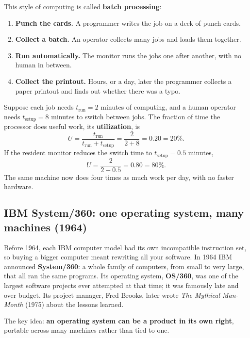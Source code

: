\documentclass[11pt,a4paper]{article}
\newcommand{\term}[1]{\textbf{\color{mintdeep}#1}}
\begin{document}
This style of computing is called \term{batch processing}:

\begin{enumerate}[leftmargin=1.4em]
  \item \textbf{Punch the cards.} A programmer writes the job on a deck of punch cards.
  \item \textbf{Collect a batch.} An operator collects many jobs and loads them together.
  \item \textbf{Run automatically.} The monitor runs the jobs one after another, with no human in between.
  \item \textbf{Collect the printout.} Hours, or a day, later the programmer collects a paper printout and finds out whether there was a typo.
\end{enumerate}

\begin{example}
Suppose each job needs $t_{\text{run}} = 2$ minutes of computing, and a human operator needs $t_{\text{setup}} = 8$ minutes to switch between jobs. The fraction of time the processor does useful work, its \term{utilization}, is
\[
U = \frac{t_{\text{run}}}{t_{\text{run}} + t_{\text{setup}}} = \frac{2}{2+8} = 0.20 = 20\%.
\]
If the resident monitor reduces the switch time to $t_{\text{setup}} = 0.5$ minutes,
\[
U = \frac{2}{2+0.5} = 0.80 = 80\%.
\]
The same machine now does four times as much work per day, with no faster hardware.
\end{example}

\subsection{IBM System/360: one operating system, many machines (1964)}

Before 1964, each IBM computer model had its own incompatible instruction set, so buying a bigger computer meant rewriting all your software. In 1964 IBM announced \term{System/360}: a whole family of computers, from small to very large, that all ran the same programs. Its operating system, \term{OS/360}, was one of the largest software projects ever attempted at that time; it was famously late and over budget. Its project manager, Fred Brooks, later wrote \emph{The Mythical Man-Month} (1975) about the lessons learned.

The key idea: \textbf{an operating system can be a product in its own right}, portable across many machines rather than tied to one.
\end{document}

